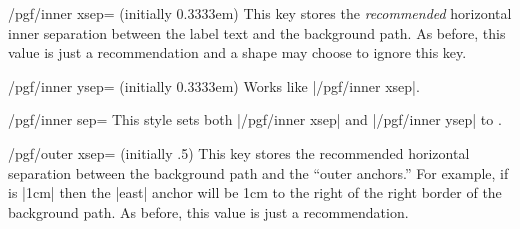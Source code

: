 \begin{key}{/pgf/inner xsep= (initially 0.3333em)}
  This key stores the \emph{recommended} horizontal
  inner separation between the label text and the background path. As
  before, this value is just a recommendation and a shape may choose
  to ignore this key.
  
\begin{codeexample}[]
\end{codeexample}
\end{key}

\begin{key}{/pgf/inner ysep= (initially 0.3333em)}
  Works like |/pgf/inner xsep|.
\end{key}

\begin{key}{/pgf/inner sep=}
  This style sets both |/pgf/inner xsep| and |/pgf/inner ysep| to .
\end{key}



\begin{key}{/pgf/outer xsep= (initially .5\string\pgflinewidth)}
  This key stores the recommended horizontal separation between the
  background path and the ``outer anchors.'' For example, if
   is |1cm| then the |east| anchor will be 1cm to the
  right of the right border of the background path. 
  As before, this value is just a recommendation.
  
\begin{codeexample}[]
\end{codeexample}
\end{key}

